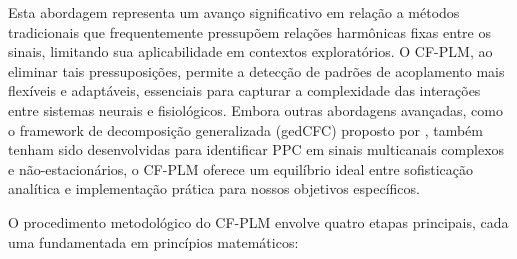Esta abordagem representa um avanço significativo em relação a métodos tradicionais que frequentemente pressupõem relações harmônicas fixas entre os sinais, limitando sua aplicabilidade em contextos exploratórios. O CF-PLM, ao eliminar tais pressuposições, permite a detecção de padrões de acoplamento mais flexíveis e adaptáveis, essenciais para capturar a complexidade das interações entre sistemas neurais e fisiológicos. Embora outras abordagens avançadas, como o framework de decomposição generalizada (gedCFC) proposto por , também tenham sido desenvolvidas para identificar PPC em sinais multicanais complexos e não-estacionários, o CF-PLM oferece um equilíbrio ideal entre sofisticação analítica e implementação prática para nossos objetivos específicos.

O procedimento metodológico do CF-PLM envolve quatro etapas principais, cada uma fundamentada em princípios matemáticos:

